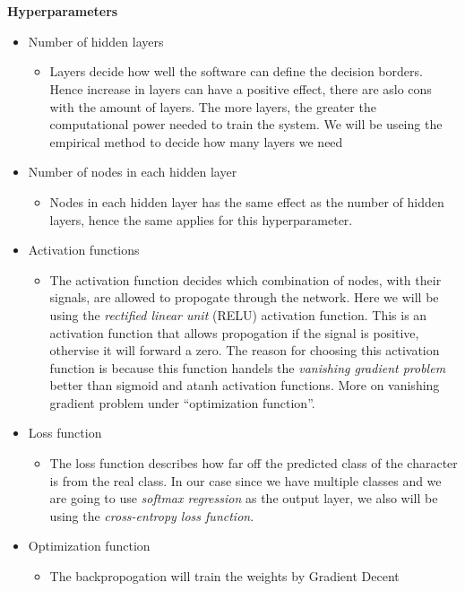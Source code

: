 \documentclass[11pt,a4paper,english]{article}
\begin{document}
\noindent \\
\noindent \\ \textbf{Hyperparameters}
\begin{itemize}
 \item{Number of hidden layers}
 \begin{itemize}
  \item{Layers decide how well the software can define the decision borders.
  Hence increase in layers can have a positive effect, there are aslo cons with
  the amount of layers. The more layers, the greater the computational power
  needed to train the system. We will be useing the empirical method to decide
  how many layers we need}
 \end{itemize}
 \item{Number of nodes in each hidden layer}
 \begin{itemize}
  \item{Nodes in each hidden layer has the same effect as the number of hidden
  layers, hence the same applies for this hyperparameter. }
 \end{itemize}
 \item{Activation functions}
 \begin{itemize}
  \item{The activation function decides which combination of nodes, with their
  signals, are allowed to propogate through the network. Here we will be using
  the \textit{rectified linear unit} (RELU) activation function. This is an
  activation function that allows propogation if the signal is positive,
  othervise it will forward a zero. The reason for choosing this activation
  function is because this function handels the \textit{vanishing gradient
  problem} better than sigmoid and atanh activation functions. More on
  vanishing gradient problem under ``optimization function''.}
 \end{itemize}
 \item{Loss function}
 \begin{itemize}
  \item{The loss function describes how far off the predicted class of the
  character is from the real class. In our case since we have multiple
  classes and we are going to use \textit{softmax regression} as the output
  layer, we also will be using the \textit{cross-entropy loss function}.}
 \end{itemize}
 \item{Optimization function}
 \begin{itemize}
  \item{The backpropogation will train the weights by Gradient Decent
}
\end{itemize}
\end{itemize}
\end{document}

